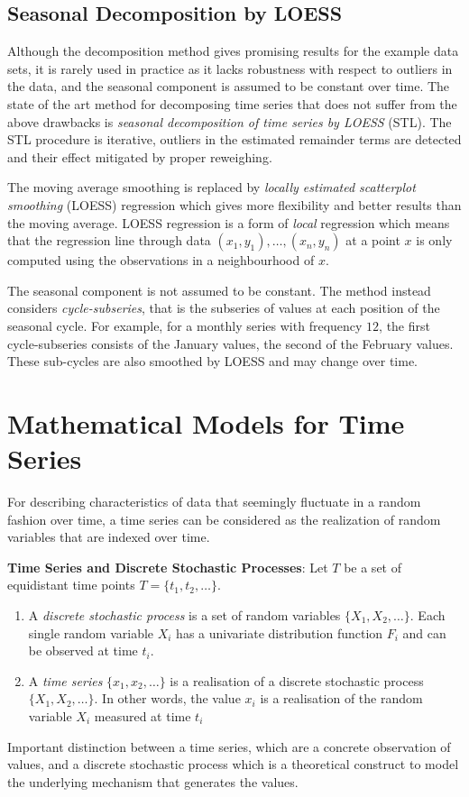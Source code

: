 \documentclass[11pt]{article}
\theoremstyle{definition}
\begin{document}
\subsection{Seasonal Decomposition by LOESS}
Although the decomposition method gives promising results for the example data sets, it is rarely used in practice as it lacks robustness with respect to outliers in the data, and the seasonal component is assumed to be constant over time. The state of the art method for decomposing time series that does not suffer from the above drawbacks is \emph{seasonal decomposition of time series by LOESS} (STL). The STL procedure is iterative, outliers in the estimated remainder terms are detected and their effect mitigated by proper reweighing.

The moving average smoothing is replaced by \emph{locally estimated scatterplot smoothing} (LOESS) regression which gives more flexibility and better results than the moving average. LOESS regression is a form of \emph{local} regression which means that the regression line through data $(x_1, y_1 ),\dots,(x_n, y_n)$ at a point $x$ is only computed using the observations in a neighbourhood of $x$.

The seasonal  component is not assumed to be constant. The method instead considers \emph{cycle-subseries}, that is the subseries of values at each position of the seasonal cycle. For example, for a monthly series with frequency $12$, the first cycle-subseries consists of the January values, the second of the February values. These sub-cycles are also smoothed by LOESS and may change over time.

\section{Mathematical Models for Time Series}
For describing characteristics of data that seemingly fluctuate in a random fashion over time, a time series can be considered as the realization of random variables that are indexed over time.

\begin{definition}
	\textbf{Time Series and Discrete Stochastic Processes}: Let $T$ be a set of equidistant time points $T =\{t_1, t_2, \dots\}$.
	\begin{enumerate}
		\item A \emph{discrete stochastic process} is a set of random variables $\{X_1, X_2, \dots\}$. Each single random variable $X_i$ has a univariate distribution function $F_i$ and can be observed at time $t_i$.
		\item A \emph{time series} $\{x_1, x_2, \dots\}$ is a realisation of a discrete stochastic process $\{X_1,X_2,\dots\}$. In other words, the value $x_i$ is a realisation of the random variable $X_i$ measured at time $t_i$
	\end{enumerate}
\end{definition}
Important distinction between a time series, which are a concrete observation of values, and a discrete stochastic process which is a theoretical construct to model the underlying mechanism that generates the values.
\end{document}

